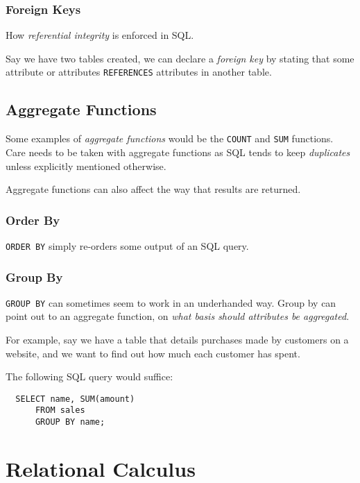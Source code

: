 \documentclass{article}
\begin{document}
\subsubsection{Foreign Keys}

How \textit{referential integrity} is enforced in SQL.

Say we have two tables created, we can declare a \textit{foreign key} by stating that some attribute or attributes \texttt{REFERENCES} attributes in another table.

\filbreak
\subsection{Aggregate Functions}

Some examples of \textit{aggregate functions} would be the \texttt{COUNT} and \texttt{SUM} functions. Care needs to be taken with aggregate functions as SQL tends to keep \textit{duplicates} unless explicitly mentioned otherwise. 

Aggregate functions can also affect the way that results are returned.

\subsubsection{Order By}

\texttt{ORDER BY} simply re-orders some output of an SQL query. 

\subsubsection{Group By}

\texttt{GROUP BY} can sometimes seem to work in an underhanded way. Group by can point out to an aggregate function, on \textit{what basis should attributes be aggregated}.

For example, say we have a table that details purchases made by customers on a website, and we want to find out how much each customer has spent.

The following SQL query would suffice:

\begin{lstlisting}
  SELECT name, SUM(amount)
      FROM sales
      GROUP BY name;
\end{lstlisting}

\section{Relational Calculus}
\end{document}

